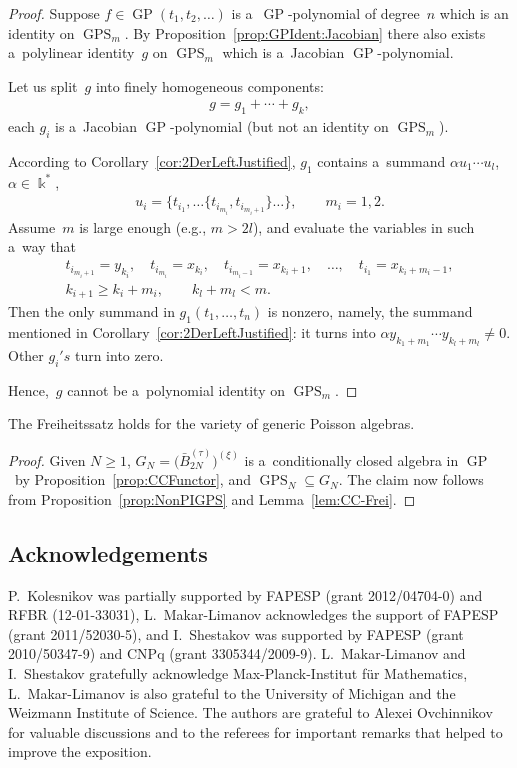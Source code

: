 \documentclass[pdftex]{sigma}
\begin{document}
\begin{proof}
Suppose $f \in \operatorname{GP}(t_1,t_2,\dots)$ is a~$\operatorname{GP}$-polynomial of degree~$n$ which is an identity on $\operatorname{GPS}_{m}$.
By Proposition~\ref{prop:GPIdent:Jacobian} there also exists a~polylinear identity~$g$ on $\operatorname{GPS}_{m}$ which is a~Jacobian
$\operatorname{GP}$-polynomial.

Let us split~$g$ into f\/inely homogeneous components:
\begin{gather*}
g = g_1 + \cdots + g_k,
\end{gather*}
each $g_i$ is a~Jacobian $\operatorname{GP}$-polynomial (but not an identity on $\operatorname{GPS}_{m}$).

According to Corollary~\ref{cor:2DerLeftJustified}, $g_1$ contains a~summand $\alpha u_1\cdots u_l$, $\alpha \in
\Bbbk^*$,
\begin{gather*}
u_i = \{t_{i_1}, \dots \{t_{i_{m_i}}, t_{i_{m_i+1}} \}\dots \},
\qquad
m_i=1,2.
\end{gather*}
Assume~$m$ is large enough (e.g., $m>2 l$), and evaluate the variables in such a~way that
\begin{gather*}
t_{i_{m_i+1}} = y_{k_i},
\quad
t_{i_{m_i}}=x_{k_i},
\quad
t_{i_{m_i-1}}=x_{k_i+1},\quad \dots,\quad  t_{i_1}=x_{k_i+m_i-1},
\\
k_{i+1}\ge k_i+m_i,
\qquad
k_l+m_l<m.
\end{gather*}
Then the only summand in $g_1(t_1,\dots, t_n) $ is nonzero, namely, the summand mentioned in
Corollary~\ref{cor:2DerLeftJustified}: it turns into $\alpha y_{k_1+m_1}\cdots y_{k_l+m_l} \ne 0$.
Other $g_i's$ turn into zero.

Hence,~$g$ cannot be a~polynomial identity on $\operatorname{GPS}_{m}$.
\end{proof}

\begin{theorem}
The Freiheitssatz holds for the variety of generic Poisson algebras.
\end{theorem}

\begin{proof}
Given $N\ge 1$, $G_N = \big(\bar B_{2N}^{(\tau)}\big)^{(\xi)}$ is a~conditionally closed algebra in $\operatorname{GP}$~by
Proposition~\ref{prop:CCFunctor}, and $\operatorname{GPS}_N\subseteq G_N$.
The claim now follows from Proposition~\ref{prop:NonPIGPS} and Lemma~\ref{lem:CC-Frei}.
\end{proof}

\subsection*{Acknowledgements}
P.~Kolesnikov was partially supported by FAPESP (grant 2012/04704-0) and RFBR (12-01-33031), L.~Makar-Limanov
acknowledges the support of FAPESP (grant 2011/52030-5), and I.~Shestakov was supported by FAPESP (grant 2010/50347-9)
and CNPq (grant 3305344/2009-9).
L.~Makar-Limanov and I.~Shestakov gratefully acknowledge Max-Planck-Institut f\"ur Ma\-the\-matics, L.~Makar-Limanov is also grateful to the University of Michigan and the Weizmann Institute of Science.
The authors are grateful to Alexei Ovchinnikov for valuable discussions and to the referees for important remarks that
helped to improve the exposition.
\end{document}
